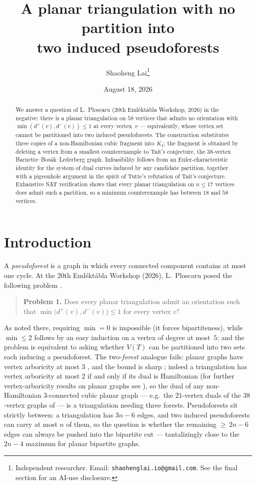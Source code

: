 \documentclass[11pt]{article}
\title{A planar triangulation with no partition into\\ two induced pseudoforests}
\author{Shaoheng Lai\thanks{Independent researcher. Email:
\texttt{shaohenglai.io@gmail.com}. See the final section for an AI-use
disclosure.}}
\date{August 18, 2026}
\theoremstyle{remark}
\newcommand{\dout}{d^{+}}
\newcommand{\din}{d^{-}}
\begin{document}
\maketitle

\begin{abstract}
We answer a question of L.~Ploscaru (20th Eml\'ekt\'abla Workshop, 2026) in
the negative: there is a planar triangulation on $58$ vertices that admits
no orientation with $\min(\dout(v),\din(v))\le 1$ at every vertex~$v$ ---
equivalently, whose vertex set cannot be partitioned into two induced
pseudoforests. The construction substitutes three copies of a
non-Hamiltonian cubic fragment into $K_4$; the fragment is obtained by
deleting a vertex from a smallest counterexample to Tait's conjecture, the
$38$-vertex Barnette--Bos\'ak--Lederberg graph. Infeasibility follows from
an Euler-characteristic identity for the system of dual curves induced by
any candidate partition, together with a pigeonhole argument in the spirit
of Tutte's refutation of Tait's conjecture. Exhaustive SAT verification
shows that every planar triangulation on $n\le 17$ vertices does admit
such a partition, so a minimum counterexample has between $18$ and $58$
vertices.
\end{abstract}

\section{Introduction}

A \emph{pseudoforest} is a graph in which every connected component
contains at most one cycle. At the 20th Eml\'ekt\'abla Workshop (2026),
L.~Ploscaru posed the following problem \cite[p.~17]{Plo26}.

\begin{quote}
\textbf{Problem 1.} Does every planar triangulation admit an orientation
such that $\min\bigl(\dout(v),\din(v)\bigr)\le 1$ for every vertex $v$?
\end{quote}

As noted there, requiring $\min=0$ is impossible (it forces
bipartiteness), while $\min\le 2$ follows by an easy induction on a vertex
of degree at most~$5$; and the problem is equivalent to asking whether
$V(T)$ can be partitioned into two sets each inducing a pseudoforest. The
two-\emph{forest} analogue fails: planar graphs have vertex arboricity at
most $3$ \cite{CKW68}, and the bound is sharp \cite{CK69}; indeed a
triangulation has vertex arboricity at most $2$ if and only if its dual is
Hamiltonian \cite{Stein71,HS89} (for further vertex-arboricity
results on planar graphs see \cite{RW08}), so the dual of any
non-Hamiltonian
$3$-connected cubic planar graph --- e.g.\ the $21$-vertex duals of the
$38$-vertex graphs of \cite{HM88} --- is a triangulation needing three
forests. Pseudoforests sit strictly between: a triangulation has $3n-6$
edges, and two induced pseudoforests can carry at most $n$ of them, so the
question is whether the remaining ${\ge}\,2n-6$ edges can always be pushed
into the bipartite cut --- tantalizingly close to the $2n-4$ maximum for
planar bipartite graphs.
\end{document}
